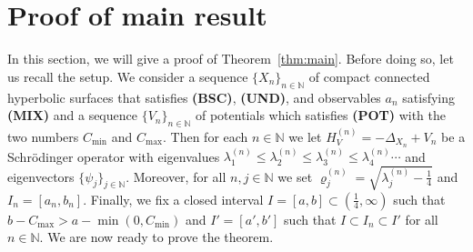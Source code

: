 \documentclass[11pt,twoside,reqno]{amsart}
\newcommand{\N}{\mathbb{N}}
\renewcommand{\rho}{\varrho}
\newcommand{\1}{\mathrm{\mathbf{1}}}
\numberwithin{equation}{section}
\theoremstyle{plain}
\theoremstyle{definition}
\theoremstyle{remark}
\begin{document}
\section{Proof of main result}\label{SEC:proof_main_thm}

In this section, we will give a proof of Theorem~\ref{thm:main}. Before doing so, let us recall the setup. We consider a sequence $ \{ X_{n} \}_{n\in\N} $ of compact connected hyperbolic surfaces that satisfies \textbf{(BSC)}, \textbf{(UND)}, and observables $a_n$ satisfying \textbf{(MIX)} and a sequence $\{ V_{n} \}_{n\in\N} $ of potentials which satisfies {\normalfont\textbf{(POT)}} with the two numbers $C_{\min}$ and $C_{\max}$. Then for each $n\in\N$ we let $H_V^{(n)}= -\Delta_{X_n}+V_n$ be a  Schr\"odinger operator with eigenvalues $\lambda_1^{(n)}\leq \lambda_2^{(n)}\leq \lambda_3^{(n)} \leq \lambda_4^{(n)} \cdots $ and eigenvectors $\{\psi_j\}_{j\in\N}$. Moreover, for all $n,j\in\N$ we set $\rho_{j}^{(n)} = \sqrt{\lambda_j^{(n)}-\frac{1}{4}}$ and $I_n=[a_n,b_n]$. Finally, we fix a closed interval $I=[a,b]\subset (\frac{1}{4},\infty)$ such that $b-C_{\max}>a  -\min(0, C_{\min})$ and $I'=[a',b']$ such that $I\subset I_n \subset I'$ for all $n\in\N$. We are now ready to prove the theorem.
\end{document}
